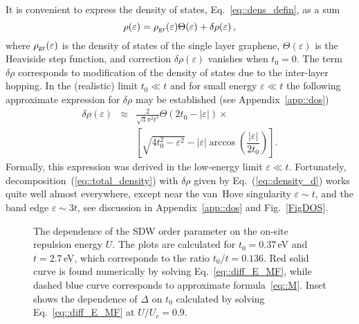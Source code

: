 \documentclass[prb,twocolumn,showpacs,aps,superscriptaddress,floatfix]{revtex4}
\begin{document}
It is convenient to express the density of states,
Eq.~\eqref{eq::dens_defin},
as a sum
\begin{equation}
\label{eq::total_density}
\rho(\varepsilon)
=
\rho_{\rm gr}(\varepsilon)\Theta(\varepsilon)+\delta\rho(\varepsilon)\,,
\end{equation}
where
$\rho_{\rm gr}(\varepsilon)$
is the density of states of the single layer graphene,
$\Theta(\varepsilon)$
is the Heaviside step function, and correction
$\delta \rho (\varepsilon)$
vanishes when
$t_0 = 0$.
The term
$\delta \rho$
corresponds to modification of the density of states due to the inter-layer
hopping. In the (realistic) limit
$t_0 \ll t$
and for small energy
$\varepsilon\ll t$
the following approximate expression for
$\delta \rho$
may be established (see
Appendix~\ref{app::dos})
\begin{eqnarray}
\label{eq::density_d}
\delta\rho(\varepsilon)\!\!
&\approx&\!\!
\frac{2}{\sqrt{3} \pi^2 t^2}
\Theta(2t_0 - |\varepsilon|)\times
\\
\nonumber
&&\left[
	\sqrt{4t_0^{2} - \varepsilon^2}
	-
	|\varepsilon| \arccos \left(\dfrac{|\varepsilon|}{2t_0}\right)
\right].
\nonumber
\end{eqnarray}
Formally, this expression was derived in the low-energy limit
$\varepsilon \ll t$.
Fortunately,
decomposition~(\ref{eq::total_density})
with
$\delta \rho$
given by
Eq.~(\ref{eq::density_d})
works quite well almost everywhere, except near the van~Hove singularity
$\varepsilon \sim t$,
and the band edge
$\varepsilon \sim 3t$,
see discussion in
Appendix~\ref{app::dos}
and
Fig.~\ref{FigDOS}.
\begin{figure}[t]
\caption{The dependence of the SDW order parameter on the on-site repulsion
energy $U$. The plots are calculated for
$t_0=0.37$\,eV
and
$t=2.7$\,eV,
which corresponds to the ratio
$t_0/t=0.136$.
Red solid curve is found numerically by solving
Eq.~\eqref{eq::diff_E_MF},
while dashed blue curve corresponds to approximate
formula~\eqref{eq::M}.
Inset shows the dependence of $\Delta$ on
$t_0$
calculated by solving
Eq.~\eqref{eq::diff_E_MF}
at
$U/U_c=0.9$.
\label{FigDeltaU}}
\end{figure}
\end{document}
